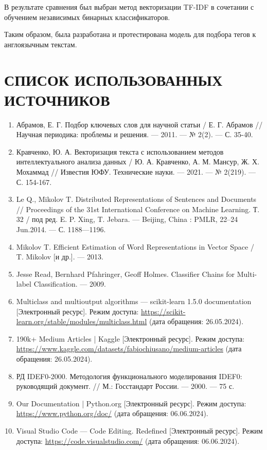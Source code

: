 \documentclass[a4paper, 12pt]{article}
\begin{document}
\begin{large}
В результате сравнения был выбран метод векторизации TF-IDF в сочетании с обучением независимых бинарных классификаторов.

Таким образом, была разработана и протестирована модель для подбора тегов к англоязычным текстам.
\newpage
\section*{СПИСОК ИСПОЛЬЗОВАННЫХ ИСТОЧНИКОВ}
\begin{enumerate}
    \item Абрамов, Е. Г. Подбор ключевых слов для научной статьи / Е. Г. Абрамов // Научная периодика: проблемы и решения. --- 2011. --- № 2(2). --- С. 35-40.
    \item Кравченко, Ю. А. Векторизация текста с использованием методов интеллектуального анализа данных / Ю. А. Кравченко, А. М. Мансур, Ж. Х. Мохаммад // Известия ЮФУ. Технические науки. --- 2021. --- № 2(219). --- С. 154-167.
    \item Le Q., Mikolov T. Distributed Representations of Sentences and Documents // Proceedings of the 31st International Conference on Machine Learning. Т. 32 / под ред. E. P. Xing, T. Jebara. --- Beijing, China : PMLR, 22–24 Jun.2014. --- С. 1188—1196.
    \item Mikolov T. Efficient Estimation of Word Representations in Vector Space / T. Mikolov [и др.]. --- 2013.
    \item Jesse Read, Bernhard Pfahringer, Geoff Holmes. Classifier Chains for Multi-label Classification. --- 2009.
    \item Multiclass and multioutput algorithms --- scikit-learn 1.5.0 documentation [Электронный ресурс]. Режим доступа: \url{https://scikit-learn.org/stable/modules/multiclass.html} (дата обращения: 26.05.2024).
    \item 190k+ Medium Articles | Kaggle [Электронный ресурс]. Режим доступа: \url{https://www.kaggle.com/datasets/fabiochiusano/medium-articles} (дата обращения: 26.05.2024).
    \item РД IDEF0-2000. Методология функционального моделирования IDEF0: руководящий документ. // М.: Госстандарт России. --- 2000. --- 75 с.
    \item Our Documentation | Python.org [Электронный ресурс]. Режим доступа: \url{https://www.python.org/doc/} (дата обращения: 06.06.2024).
    \item Visual Studio Code --- Code Editing. Redefined [Электронный ресурс]. Режим доступа: \url{https://code.visualstudio.com/} (дата обращения: 06.06.2024).

\end{enumerate}
\end{large}
\end{document}
